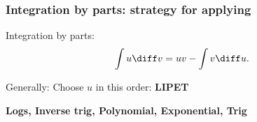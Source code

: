 \begin{frame}
\frametitle{Integration by parts: strategy for applying}
Integration by parts:
\belowdisplayskip=0pt
\abovedisplayskip=0pt
\[
\int u\diff v = uv - \int v\diff u.
\]

\begin{center}
Generally: Choose $u$ in this order: {\Large \textbf{  LIPET}}
\end{center}
\pause

\begin{center}
{\Large \textbf{  Logs, Inverse trig, Polynomial, Exponential, Trig
}}
\end{center}
\end{frame}

